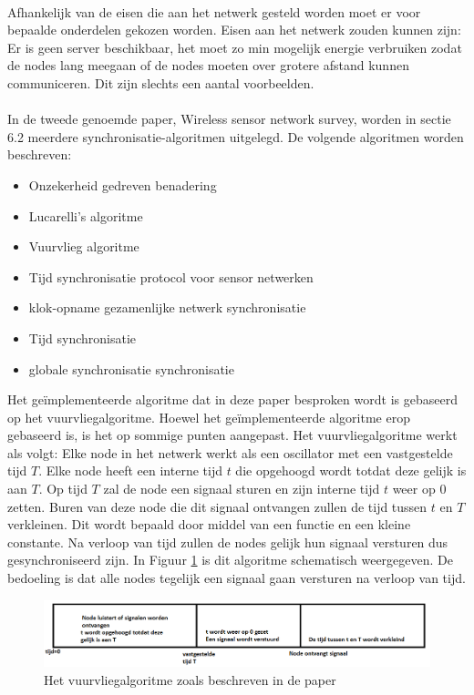\documentclass{article}
\begin{document}
\\
Afhankelijk van de eisen die aan het netwerk gesteld worden moet er voor bepaalde onderdelen gekozen worden. Eisen aan het netwerk zouden kunnen zijn: Er is geen server beschikbaar, het moet zo min mogelijk energie verbruiken zodat de nodes lang meegaan of de nodes moeten over grotere afstand kunnen communiceren. Dit zijn slechts een aantal voorbeelden. \\
\\
In de tweede genoemde paper, Wireless sensor network survey, worden in sectie 6.2 meerdere synchronisatie-algoritmen uitgelegd. De volgende algoritmen worden beschreven:
\begin{itemize}
	\item Onzekerheid gedreven benadering
	\item Lucarelli's algoritme
	\item Vuurvlieg algoritme
	\item Tijd synchronisatie protocol voor sensor netwerken
	\item klok-opname gezamenlijke netwerk synchronisatie
	\item Tijd synchronisatie
	\item globale synchronisatie
	synchronisatie 
\end{itemize}
Het ge\"{i}mplementeerde algoritme dat in deze paper besproken wordt is gebaseerd op het vuurvliegalgoritme. Hoewel het ge\"{i}mplementeerde algoritme erop gebaseerd is, is het op sommige punten aangepast. 
Het vuurvliegalgoritme werkt als volgt: 
Elke node in het netwerk werkt als een oscillator met een vastgestelde tijd $T$. Elke node heeft een interne tijd $t$ die opgehoogd wordt totdat deze gelijk is aan $T$. Op tijd $T$ zal de node een signaal sturen en zijn interne tijd $t$ weer op $0$ zetten. Buren van deze node die dit signaal ontvangen zullen de tijd tussen $t$ en $T$ verkleinen. Dit wordt bepaald door middel van een functie en een kleine constante. Na verloop van tijd zullen de nodes gelijk hun signaal versturen dus gesynchroniseerd zijn. In Figuur \ref{fig: Firefly} is dit algoritme schematisch weergegeven. De bedoeling is dat alle nodes tegelijk een signaal gaan versturen na verloop van tijd.  
\begin{figure}[h]
\centering\includegraphics[scale=0.5]{Firefly}
\caption{Het vuurvliegalgoritme zoals beschreven in de paper}
\label{fig: Firefly}
\end{figure}
\end{document}
